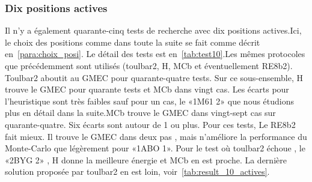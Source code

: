    \subsubsection{Dix positions actives}
Il n'y a également quarante-cinq tests de recherche avec dix positions actives.Ici, le choix des positions comme dans toute la suite se fait comme décrit en~\ref{para:choix_posi}. Le détail des tests est en~\ref{tab:test10}.Les mêmes protocoles que précédemment sont utilisés (toulbar2, H, MCb et éventuellement RE8b2). Toulbar2 aboutit au GMEC pour quarante-quatre tests. Sur ce sous-ensemble, H trouve le GMEC pour quarante tests et MCb dans vingt cas. Les écarts pour l'heuristique sont très faibles sauf pour un cas, le «1M61 2» que nous étudions plus en détail dans la suite.MCb trouve le GMEC dans vingt-sept cas sur quarante-quatre. Six écarts sont autour de 1 ou plus. Pour ces tests, Le RE8b2 fait mieux. Il trouve le  GMEC dans deux pas , mais n'améliore la performance du Monte-Carlo que légèrement pour «1ABO 1». Pour le test où toulbar2 échoue , le «2BYG 2» , H donne la meilleure énergie et MCb en est proche. La dernière solution proposée par toulbar2 en est loin, voir~\ref{tab:result_10_actives}.  

